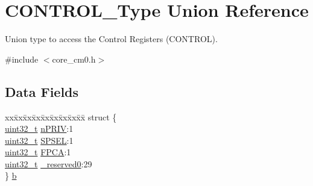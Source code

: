 \hypertarget{union_c_o_n_t_r_o_l___type}{\section{C\-O\-N\-T\-R\-O\-L\-\_\-\-Type Union Reference}
\label{union_c_o_n_t_r_o_l___type}
}


Union type to access the Control Registers (C\-O\-N\-T\-R\-O\-L).  




{\ttfamily \#include $<$core\-\_\-cm0.\-h$>$}

\subsection*{Data Fields}
\begin{DoxyCompactItemize}
\item 
\begin{tabbing}
xx\=xx\=xx\=xx\=xx\=xx\=xx\=xx\=xx\=\kill
struct \{\\
\>\hyperlink{stdint_8h_a435d1572bf3f880d55459d9805097f62}{uint32\_t} \hyperlink{union_c_o_n_t_r_o_l___type_a35c1732cf153b7b5c4bd321cf1de9605}{nPRIV}:1\\
\>\hyperlink{stdint_8h_a435d1572bf3f880d55459d9805097f62}{uint32\_t} \hyperlink{union_c_o_n_t_r_o_l___type_a8cc085fea1c50a8bd9adea63931ee8e2}{SPSEL}:1\\
\>\hyperlink{stdint_8h_a435d1572bf3f880d55459d9805097f62}{uint32\_t} \hyperlink{union_c_o_n_t_r_o_l___type_ac62cfff08e6f055e0101785bad7094cd}{FPCA}:1\\
\>\hyperlink{stdint_8h_a435d1572bf3f880d55459d9805097f62}{uint32\_t} \hyperlink{union_c_o_n_t_r_o_l___type_af8c314273a1e4970a5671bd7f8184f50}{\_reserved0}:29\\
\} \hyperlink{union_c_o_n_t_r_o_l___type_aa62abc89b024d8037a1b1ffe596b0d2b}{b}\\


\end{tabbing}
\end{DoxyCompactItemize}
